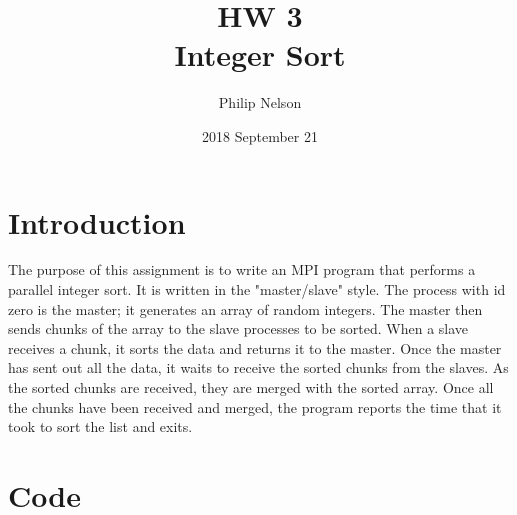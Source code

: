 \documentclass{article}
\title{HW 3 \\ Integer Sort}
\author{Philip Nelson}
\date{2018 September 21}
\begin{document}
\maketitle

\section*{Introduction}

The purpose of this assignment is to write an MPI program that performs a parallel integer sort. It is written in the "master/slave" style. The process with id zero is the master; it generates an array of random integers. The master then sends chunks of the array to the slave processes to be sorted. When a slave receives a chunk, it sorts the data and returns it to the master. Once the master has sent out all the data, it waits to receive the sorted chunks from the slaves. As the sorted chunks are received, they are merged with the sorted array. Once all the chunks have been received and merged, the program reports the time that it took to sort the list and exits.

\section*{Code}
\end{document}
